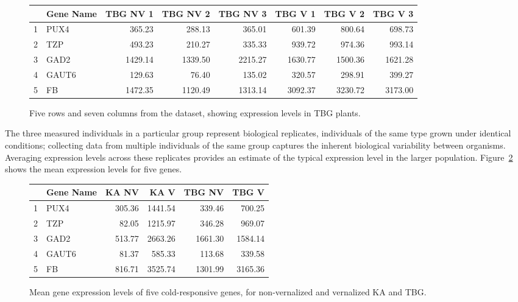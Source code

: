 \begin{figure}[h]
	\centering
	\begin{tabular}{rlrrrrrr}
		\hline
		& Gene Name & TBG NV 1 & TBG NV 2 & TBG NV 3 & TBG V 1 & TBG V 2 & TBG V 3 \\ 
		\hline
		1 & PUX4 & 365.23 & 288.13 & 365.01 & 601.39 & 800.64 & 698.73 \\ 
		2 & TZP & 493.23 & 210.27 & 335.33 & 939.72 & 974.36 & 993.14 \\ 
		3 & GAD2 & 1429.14 & 1339.50 & 2215.27 & 1630.77 & 1500.36 & 1621.28 \\ 
		4 & GAUT6 & 129.63 & 76.40 & 135.02 & 320.57 & 298.91 & 399.27 \\ 
		5 & FB & 1472.35 & 1120.49 & 1313.14 & 3092.37 & 3230.72 & 3173.00 \\ 
		\hline
	\end{tabular}
	\caption{Five rows and seven columns from the  dataset, showing expression levels in TBG plants.} 
	\label{sampleArenosaTBG}
\end{figure}

\textD{\newpage}

The three measured individuals in a particular group represent biological replicates, individuals of the same type grown under identical conditions; collecting data from multiple individuals of the same group captures the inherent biological variability between organisms. Averaging expression levels across these replicates provides an estimate of the typical expression level in the larger population. Figure~\ref{sampleArenosaMeans} shows the mean expression levels for five genes. 

\begin{figure}[h]
	\centering
	\begin{tabular}{rlrrrr}
		\hline
		& Gene Name & KA NV & KA V & TBG NV & TBG V \\ 
		\hline
		1 & PUX4 & 305.36 & 1441.54 & 339.46 & 700.25 \\ 
		2 & TZP & 82.05 & 1215.97 & 346.28 & 969.07 \\ 
		3 & GAD2 & 513.77 & 2663.26 & 1661.30 & 1584.14 \\ 
		4 & GAUT6 & 81.37 & 585.33 & 113.68 & 339.58 \\ 
		5 & FB & 816.71 & 3525.74 & 1301.99 & 3165.36 \\ 
		\hline
	\end{tabular}
	\caption{Mean gene expression levels of five cold-responsive genes, for non-vernalized and vernalized KA and TBG.} 
	\label{sampleArenosaMeans}
\end{figure}

